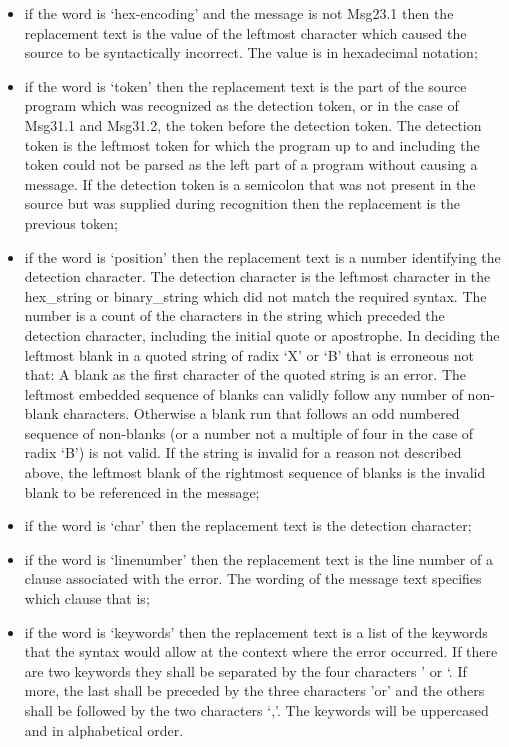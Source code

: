 \begin{itemize}
\item
  if the word is `hex-encoding' and the message is not Msg23.1 then the
  replacement text is the value of the leftmost character which caused
  the source to be syntactically incorrect. The value is in hexadecimal
  notation;
\item
  if the word is `token' then the replacement text is the part of the
  source program which was recognized as the detection token, or in the
  case of Msg31.1 and Msg31.2, the token before the detection token. The
  detection token is the leftmost token for which the program up to and
  including the token could not be parsed as the left part of a program
  without causing a message. If the detection token is a semicolon that
  was not present in the source but was supplied during recognition then
  the replacement is the previous token;
\item
  if the word is `position' then the replacement text is a number
  identifying the detection character. The detection character is the
  leftmost character in the hex\_string or binary\_string which did not
  match the required syntax. The number is a count of the characters in
  the string which preceded the detection character, including the
  initial quote or apostrophe. In deciding the leftmost blank in a
  quoted string of radix `X' or `B' that is erroneous not that: A blank
  as the first character of the quoted string is an error. The leftmost
  embedded sequence of blanks can validly follow any number of non-blank
  characters. Otherwise a blank run that follows an odd numbered
  sequence of non-blanks (or a number not a multiple of four in the case
  of radix `B') is not valid. If the string is invalid for a reason not
  described above, the leftmost blank of the rightmost sequence of
  blanks is the invalid blank to be referenced in the message;
\item
  if the word is `char' then the replacement text is the detection
  character;
\item
  if the word is `linenumber' then the replacement text is the line
  number of a clause associated with the error. The wording of the
  message text specifies which clause that is;
\item
  if the word is `keywords' then the replacement text is a list of the
  keywords that the syntax would allow at the context where the error
  occurred. If there are two keywords they shall be separated by the
  four characters ' or `. If more, the last shall be preceded by the
  three characters 'or' and the others shall be followed by the two
  characters `,'. The keywords will be uppercased and in alphabetical
  order.
\end{itemize}


